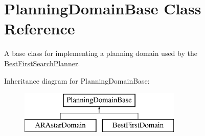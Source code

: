 \hypertarget{class_planning_domain_base}{\section{Planning\-Domain\-Base Class Reference}
\label{class_planning_domain_base}
}


A base class for implementing a planning domain used by the \hyperlink{class_best_first_search_planner}{Best\-First\-Search\-Planner}.  


Inheritance diagram for Planning\-Domain\-Base\-:\begin{figure}[H]
\begin{center}
\leavevmode
\includegraphics[height=2.000000cm]{class_planning_domain_base}
\end{center}
\end{figure}
